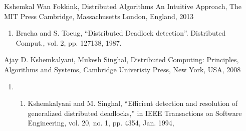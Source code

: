 \documentclass[letterpaper,10pt,english]{sphinxmanual}
\begin{document}
\begin{sphinxthebibliography}{Kshemkal}
\sphinxAtStartPar
Wan Fokkink, Distributed Algorithms An Intuitive Approach, The MIT Press Cambridge, Massachusetts London, England, 2013
\begin{enumerate}
%
\setcounter{enumi}{6}
\item {} 
\sphinxAtStartPar
Bracha and S. Toeug, “Distributed Deadlock detection”. Distributed Comput., vol. 2, pp. 127\sphinxhyphen{}138, 1987.

\end{enumerate}
\sphinxAtStartPar
Ajay D. Kshemkalyani, Mukesh Singhal, Distributed Computing: Principles, Algorithms and Systems, Cambridge Univeristy Press, New York, USA, 2008
\begin{enumerate}
%
\item {} \begin{enumerate}
%
\setcounter{enumii}{3}
\item {} 
\sphinxAtStartPar
Kshemkalyani and M. Singhal, “Efficient detection and resolution of generalized distributed deadlocks,” in IEEE Transactions on Software Engineering, vol. 20, no. 1, pp. 43\sphinxhyphen{}54, Jan. 1994,

\end{enumerate}

\end{enumerate}
\end{sphinxthebibliography}



\renewcommand{\indexname}{Index}
\printindex
\end{document}

